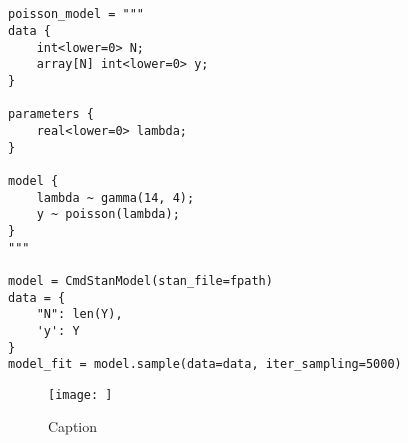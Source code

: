 \subsection{}

\begin{verbatim}
poisson_model = """
data {
    int<lower=0> N;
    array[N] int<lower=0> y;
}

parameters {
    real<lower=0> lambda;
}

model {
    lambda ~ gamma(14, 4);
    y ~ poisson(lambda);
}
"""

model = CmdStanModel(stan_file=fpath)
data = {
    "N": len(Y),
    'y': Y
}
model_fit = model.sample(data=data, iter_sampling=5000)
\end{verbatim}

\begin{figure}
    \centering
    \texttt{[image: ]}
    \caption{Caption}
    \label{fig:enter-label}
\end{figure}